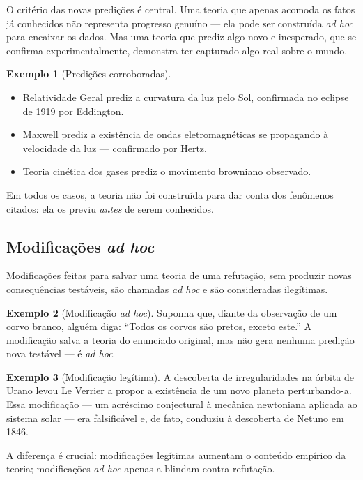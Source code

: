 \documentclass[9pt,a4paper]{extarticle}
\newcommand{\impt}[1]{\textcolor{important}{#1}}
\theoremstyle{definition}
\newtheorem{example}{Exemplo}[section]
\begin{document}
O critério das novas predições é central. Uma teoria que apenas \impt{acomoda} os fatos já conhecidos não representa progresso genuíno --- ela pode ser construída \emph{ad hoc} para encaixar os dados. Mas uma teoria que \impt{prediz algo novo e inesperado}, que se confirma experimentalmente, demonstra ter capturado algo real sobre o mundo.

\begin{example}[Predições corroboradas]
\begin{itemize}
  \item \impt{Relatividade Geral} prediz a curvatura da luz pelo Sol, confirmada no eclipse de 1919 por Eddington.
  \item \impt{Maxwell} prediz a existência de ondas eletromagnéticas se propagando à velocidade da luz --- confirmado por Hertz.
  \item \impt{Teoria cinética dos gases} prediz o movimento browniano observado.
\end{itemize}
Em todos os casos, a teoria não foi construída para dar conta dos fenômenos citados: ela os previu \emph{antes} de serem conhecidos.
\end{example}

\subsection{Modificações \emph{ad hoc}}

Modificações feitas para salvar uma teoria de uma refutação, sem produzir novas consequências testáveis, são chamadas \impt{\emph{ad hoc}} e são consideradas ilegítimas.

\begin{example}[Modificação \emph{ad hoc}]
Suponha que, diante da observação de um corvo branco, alguém diga: ``Todos os corvos são pretos, exceto este.'' A modificação salva a teoria do enunciado original, mas não gera nenhuma predição nova testável --- é \emph{ad hoc}.
\end{example}

\begin{example}[Modificação legítima]
A descoberta de irregularidades na órbita de Urano levou Le Verrier a propor a existência de um novo planeta perturbando-a. Essa modificação --- um acréscimo conjectural à mecânica newtoniana aplicada ao sistema solar --- era falsificável e, de fato, conduziu à descoberta de Netuno em 1846.
\end{example}

A diferença é crucial: modificações legítimas \impt{aumentam o conteúdo empírico} da teoria; modificações \emph{ad hoc} apenas a blindam contra refutação.
\end{document}

